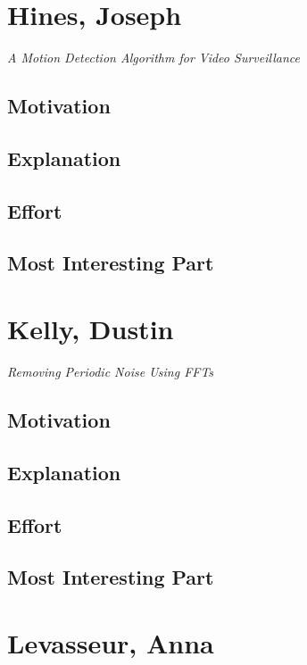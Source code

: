 \documentclass[12pt]{article}
\begin{document}
\newpage
\section{Hines, Joseph}

\textit{A Motion Detection Algorithm for Video Surveillance}

\subsection{Motivation}

\subsection{Explanation}

\subsection{Effort}

\subsection{Most Interesting Part}

\newpage
\section{Kelly, Dustin}

\textit{Removing Periodic Noise Using FFTs}

\subsection{Motivation}

\subsection{Explanation}

\subsection{Effort}

\subsection{Most Interesting Part}

\newpage
\section{Levasseur, Anna}
\end{document}
